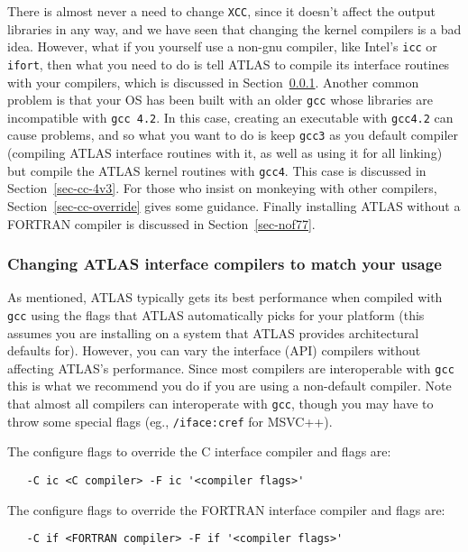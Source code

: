 \documentclass[11pt]{article}
\begin{document}
There is almost never a need to change {\tt XCC}, since it doesn't affect
the output libraries in any way, and we have seen that changing the kernel
compilers is a bad idea.  However, what if you yourself use a non-gnu
compiler, like Intel's {\tt icc} or {\tt ifort}, then what you need to
do is tell ATLAS to compile its interface routines with your compilers,
which is discussed in Section~\ref{sec-cc-iface}.  Another common problem
is that your OS has been built with an older {\tt gcc} whose libraries
are incompatible with {\tt gcc 4.2}.  In this case, creating an executable
with {\tt gcc4.2} can cause problems, and so what you want to do is keep
{\tt gcc3} as you default compiler (compiling ATLAS interface routines
with it, as well as using it for all linking) but
compile the ATLAS kernel routines with {\tt gcc4}.  This
case is discussed in Section~\ref{sec-cc-4v3}.
For those who insist on monkeying with
other compilers, Section~\ref{sec-cc-override} gives some guidance.
Finally installing ATLAS without a FORTRAN compiler
is discussed in Section~\ref{sec-nof77}.

\subsubsection{Changing ATLAS interface compilers to match your usage}
\label{sec-cc-iface}

As mentioned, ATLAS typically gets its best performance when compiled
with {\tt gcc} using the flags that ATLAS automatically picks for
your platform (this assumes you are installing on a system that ATLAS
provides architectural defaults for).  However, you can vary the interface
(API) compilers without affecting ATLAS's performance.  Since most compilers
are interoperable with {\tt gcc} this is what we recommend you do if you
are using a non-default compiler.  Note that almost all compilers can
interoperate with {\tt gcc}, though you may have to throw some special
flags (eg., {\tt /iface:cref} for MSVC++).

The configure flags to override the C interface compiler and flags are:
\vspace*{-0.1in}
\begin{verbatim}
   -C ic <C compiler> -F ic '<compiler flags>'
\end{verbatim}

The configure flags to override the FORTRAN interface compiler and flags are:
\vspace*{-0.1in}
\begin{verbatim}
   -C if <FORTRAN compiler> -F if '<compiler flags>'
\end{verbatim}
\end{document}
